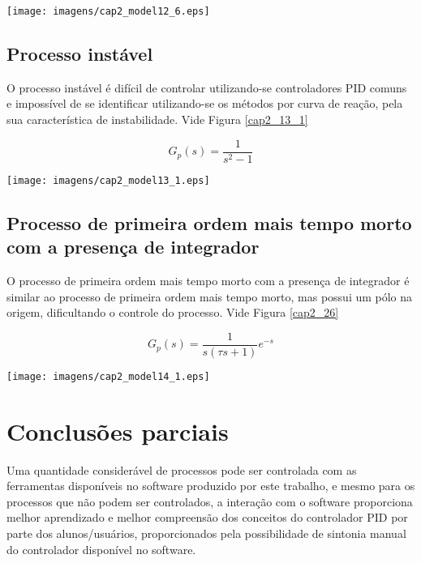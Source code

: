     \begin{center}
        \texttt{[image: imagens/cap2\_model12\_6.eps]}
	\label{cap2_12_6}
    \end{center}

\subsection{Processo instável}
    
    O processo instável é difícil de controlar utilizando-se controladores \ac{PID}
    comuns e impossível de se identificar utilizando-se os métodos por curva de
    reação, pela sua característica de instabilidade. Vide Figura \ref{cap2_13_1}
    
    \begin{equation}
        G_p(s) = \frac{1}{s^2 - 1}
    \end{equation}
    
    \begin{center}
        \texttt{[image: imagens/cap2\_model13\_1.eps]}
	\label{cap2_13_1}
    \end{center}

\subsection{Processo de primeira ordem mais tempo morto com a presença de integrador}
    
    O processo de primeira ordem mais tempo morto com a presença de integrador é
    similar ao processo de primeira ordem mais tempo morto, mas possui um pólo
    na origem, dificultando o controle do processo. Vide Figura \ref{cap2_26}
    
    \begin{equation}
        G_p(s) = \frac{1}{s(\tau s + 1)}e^{-s}
    \end{equation}
    
    \begin{center}
        \texttt{[image: imagens/cap2\_model14\_1.eps]}
        \label{cap2_26}
    \end{center}

\section{Conclusões parciais}

    Uma quantidade considerável de processos pode ser controlada com as ferramentas
    disponíveis no software produzido por este trabalho, e mesmo para os processos
    que não podem ser controlados, a interação com o software proporciona melhor
    aprendizado e melhor compreensão dos conceitos do controlador \ac{PID}
    por parte dos alunos/usuários, proporcionados pela possibilidade de sintonia
    manual do controlador disponível no software.
